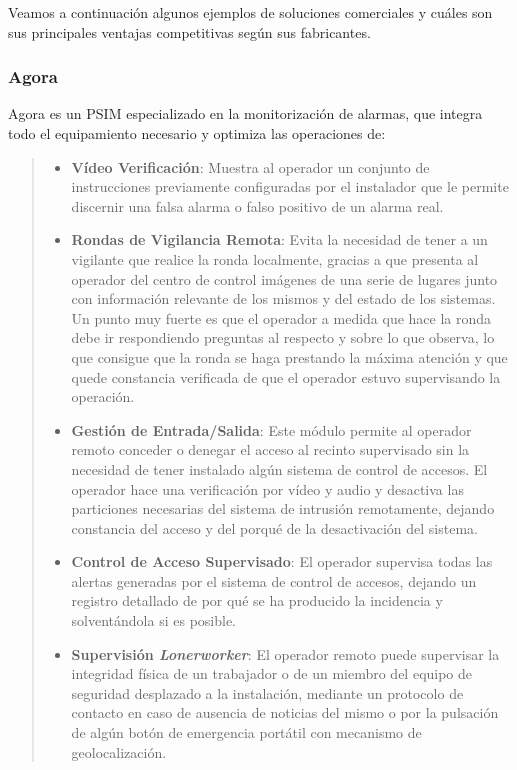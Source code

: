 Veamos a continuación algunos ejemplos de soluciones comerciales y cuáles son sus principales ventajas competitivas según sus fabricantes.

\subsubsection{Agora}

Agora es un \acs{PSIM} especializado en la monitorización de alarmas, que integra todo el equipamiento necesario y optimiza las operaciones de:
\begin{quote}
\begin{itemize}
\item \textbf{Vídeo Verificación}: Muestra al operador un conjunto de instrucciones previamente configuradas por el instalador que le permite discernir una falsa alarma o falso positivo de un alarma real.
\item \textbf{Rondas de Vigilancia Remota}: Evita la necesidad de tener a un vigilante que realice la ronda localmente, gracias a que presenta al operador del centro de control imágenes de una serie de lugares junto con información relevante de los mismos y del estado de los sistemas. Un punto muy fuerte es que el operador a medida que hace la ronda debe ir respondiendo preguntas al respecto y sobre lo que observa, lo que consigue que la ronda se haga prestando la máxima atención y que quede constancia verificada de que el operador estuvo supervisando la operación.
\item \textbf{Gestión de Entrada/Salida}: Este módulo permite al operador remoto conceder o denegar el acceso al recinto supervisado sin la necesidad de tener instalado algún sistema de control de accesos. El operador hace una verificación por vídeo y audio y desactiva las particiones necesarias del sistema de intrusión remotamente, dejando constancia del acceso y del porqué de la desactivación del sistema.
\item \textbf{Control de Acceso Supervisado}: El operador supervisa todas las alertas generadas por el sistema de control de accesos, dejando un registro detallado de por qué se ha producido la incidencia y solventándola si es posible.
\item \textbf{Supervisión \textit{Lonerworker}}: El operador remoto puede supervisar la integridad física de un trabajador o de un miembro del equipo de seguridad desplazado a la instalación, mediante un protocolo de contacto en caso de ausencia de noticias del mismo o por la pulsación de algún botón de emergencia portátil con mecanismo de geolocalización.

\end{itemize}
\end{quote}
